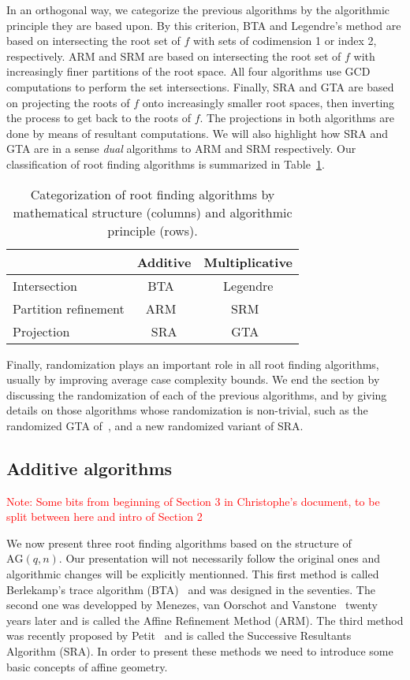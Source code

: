 \documentclass{article}
\newcommand{\qq}{q}
\newcommand{\nn}{n}
\newcommand{\AG}{\mathrm{AG}(\qq,\nn)}
\newcounter{algo}
\newcommand{\Notes}[1]{\textcolor{red}{Note: #1}}
\begin{document}
In an orthogonal way, we categorize the previous algorithms by the
algorithmic principle they are based upon. By this criterion, BTA and
Legendre's method are based on intersecting the root set of $f$ with
sets of codimension 1 or index 2, respectively. ARM and SRM are based
on intersecting the root set of $f$ with increasingly finer partitions
of the root space. All four algorithms use GCD computations to perform
the set intersections. Finally, SRA and GTA are based on projecting
the roots of $f$ onto increasingly smaller root spaces, then inverting
the process to get back to the roots of $f$. The projections in both
algorithms are done by means of resultant computations. We will also
highlight how SRA and GTA are in a sense \emph{dual} algorithms to ARM
and SRM respectively. Our classification of root finding algorithms is
summarized in Table~\ref{tab:algorithms}.

\begin{table}
  \centering
  \begin{tabular}{l | c c}
    & Additive & Multiplicative\\
    \hline
    Intersection & BTA~\cite{berl70} & Legendre\\
    Partition refinement & ARM~\cite{Menvanovans92} & SRM~\cite{Moenck77}\\
    Projection & SRA\cite{cgUCL-P14} & GTA~\cite{grenet2015deterministic}
  \end{tabular}
  \caption{Categorization of root finding algorithms by mathematical structure (columns) and algorithmic principle (rows).}
  \label{tab:algorithms}
\end{table}

Finally, randomization plays an important role in all root finding
algorithms, usually by improving average case complexity bounds.  We end
the section by discussing the randomization of each of the previous
algorithms, and by giving details on those algorithms whose
randomization is non-trivial, such as the randomized GTA
of~\cite{grenet-hoeven-lecerf-roots}, and a new randomized variant of
SRA.


\subsection{Additive algorithms}
\label{sec:affine-geom-algor}
\Notes{Some bits from beginning of Section 3 in Christophe's document, to be split between here and  intro of Section 2}

\medskip 

We now present three root finding algorithms based on the structure of $\AG$. Our presentation will not necessarily follow the original ones and algorithmic changes will be explicitly mentionned. 
This first method is called Berlekamp's trace algorithm (BTA)~\cite{berl70} and was designed in the seventies. The second one was developped by Menezes, van Oorschot and Vanstone~\cite{Menvanovans92}
 twenty years later and is called the Affine Refinement Method (ARM). The third method was recently 
 proposed by Petit~\cite{cgUCL-P14} and is called the Successive Resultants Algorithm (SRA). In order to present these methods we need to introduce some basic concepts of affine geometry.
\end{document}
